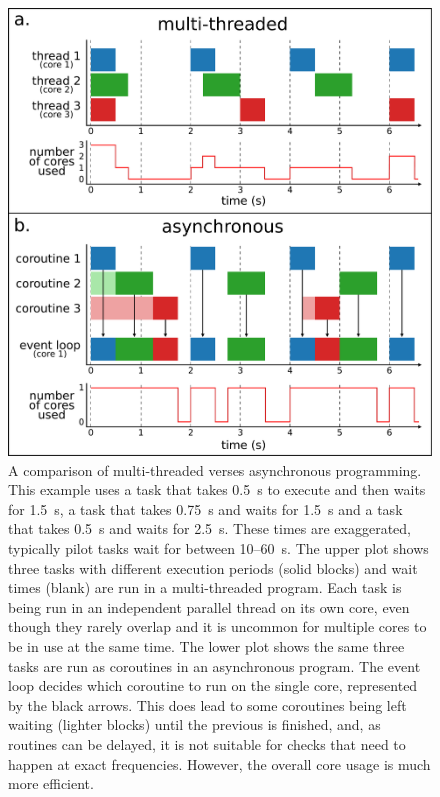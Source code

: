 \begin{colsection}
\begin{figure}[p]
    \begin{center}
        \includegraphics[width=0.89\linewidth]{images/async.pdf}
    \end{center}
    \caption[Multi-threaded verses asynchronous programming]{
        A comparison of multi-threaded verses asynchronous programming. This example uses a  task that takes \SI{0.5}{\second} to execute and then waits for \SI{1.5}{\second}, a  task that takes \SI{0.75}{\second} and waits for \SI{1.5}{\second} and a  task that takes \SI{0.5}{\second} and waits for \SI{2.5}{\second}. These times are exaggerated, typically pilot tasks wait for between 10--\SI{60}{\second}.
        The upper plot shows three tasks with different execution periods (solid blocks) and wait times (blank) are run in a multi-threaded program. Each task is being run in an independent parallel thread on its own core, even though they rarely overlap and it is uncommon for multiple cores to be in use at the same time.
        The lower plot shows the same three tasks are run as coroutines in an asynchronous program. The event loop decides which coroutine to run on the single core, represented by the black arrows. This does lead to some coroutines being left waiting (lighter blocks) until the previous is finished, and, as routines can be delayed, it is not suitable for checks that need to happen at exact frequencies. However, the overall core usage is much more efficient.
    }\label{fig:async}
\end{figure}


\end{colsection}
